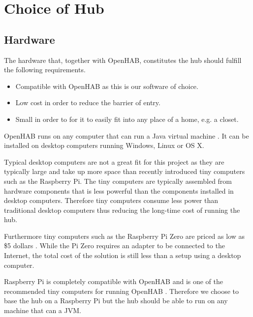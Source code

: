 \section{Choice of Hub}
\label{sec:analysis:choice-of-hub}

\subsection{Hardware}

The hardware that, together with OpenHAB, constitutes the hub should fulfill the following requirements.

\begin{itemize}
\item Compatible with OpenHAB as this is our software of choice.
\item Low cost in order to reduce the barrier of entry.
\item Small in order to for it to easily fit into any place of a home, e.g. a closet.
\end{itemize}

OpenHAB runs on any computer that can run a Java virtual machine \cite{openhab:introduction}. It can be installed on desktop computers running Windows, Linux or OS X.

Typical desktop computers are not a great fit for this project as they are typically large and take up more space than recently introduced tiny computers such as the Raspberry Pi. The tiny computers are typically assembled from hardware components that is less powerful than the components installed in desktop computers. Therefore tiny computers consume less power than traditional desktop computers thus reducing the long-time cost of running the hub.

Furthermore tiny computers such as the Raspberry Pi Zero are priced as low as \$5 dollars \cite{raspberrypi:zero}. While the Pi Zero requires an adapter to be connected to the Internet, the total cost of the solution is still less than a setup using a desktop computer.

Raspberry Pi is completely compatible with OpenHAB and is one of the recommended tiny computers for running OpenHAB \cite{openhab:hardware}. Therefore we choose to base the hub on a Raspberry Pi but the hub should be able to run on any machine that can a JVM.

